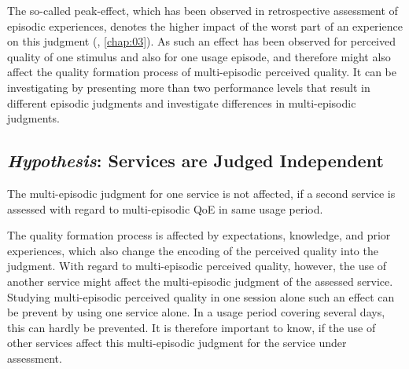 The so-called peak-effect, which has been observed in retrospective assessment of episodic experiences, denotes the higher impact of the worst part of an experience on this judgment (\cf, \autoref{chap:03}).
As such an effect has been observed for perceived quality of one stimulus and also for one usage episode, and therefore might also affect the quality formation process of multi-episodic perceived quality.
It can be investigating by presenting more than two performance levels that result in different episodic judgments and investigate differences in multi-episodic judgments.

\subsection{\emph{Hypothesis}: Services are Judged Independent}
\begin{hypothesis}\label{hypo:independent}
The multi-episodic judgment for one service is not affected, if a second service is assessed with regard to multi-episodic QoE in same usage period.
\end{hypothesis}

The quality formation process is affected by expectations, knowledge, and prior experiences, which also change the encoding of the perceived quality into the judgment.
With regard to multi-episodic perceived quality, however, the use of another service might affect the multi-episodic judgment of the assessed service.
Studying multi-episodic perceived quality in one session alone such an effect can be prevent by using one service alone.
In a usage period covering several days, this can hardly be prevented.
It is therefore important to know, if the use of other services affect this multi-episodic judgment for the service under assessment.



